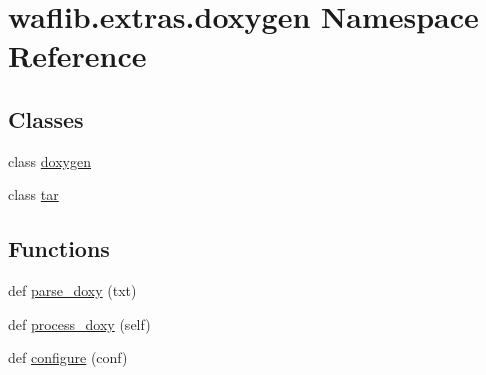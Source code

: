 \hypertarget{namespacewaflib_1_1extras_1_1doxygen}{}\section{waflib.\+extras.\+doxygen Namespace Reference}
\label{namespacewaflib_1_1extras_1_1doxygen}
\subsection*{Classes}
\begin{DoxyCompactItemize}
\item 
class \hyperlink{classwaflib_1_1extras_1_1doxygen_1_1doxygen}{doxygen}
\item 
class \hyperlink{classwaflib_1_1extras_1_1doxygen_1_1tar}{tar}
\end{DoxyCompactItemize}
\subsection*{Functions}
\begin{DoxyCompactItemize}
\item 
def \hyperlink{namespacewaflib_1_1extras_1_1doxygen_ad00d728a0949db6dd441165547e07e7a}{parse\+\_\+doxy} (txt)
\item 
def \hyperlink{namespacewaflib_1_1extras_1_1doxygen_a88b85c6ce6a068c606c3e035e84d8760}{process\+\_\+doxy} (self)
\item 
def \hyperlink{namespacewaflib_1_1extras_1_1doxygen_a172fdeb5aa82f9d3d452b22a5f4abe70}{configure} (conf)
\end{DoxyCompactItemize}
